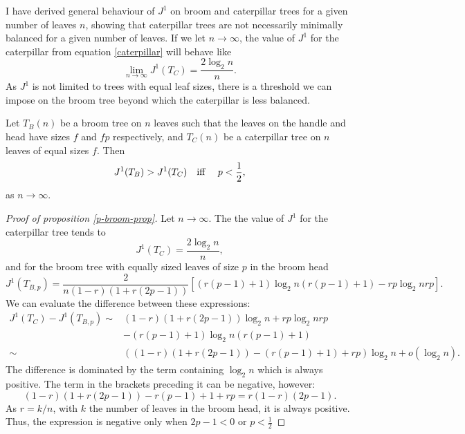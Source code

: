 I have derived general behaviour of $J^1$ on broom and caterpillar trees for a
given number of leaves $n$, showing that caterpillar trees are not necessarily
minimally balanced for a given number of leaves. If we let $n\to\infty$, the
value of $J^1$ for the caterpillar from equation \eqref{caterpillar} will
behave like
\begin{equation}
    \lim_{n\to\infty} J^1(T_C) = \frac{2\log_2n}{n}. \label{caterpillarlim}
\end{equation}
As $J^1$ is not limited to trees with equal leaf sizes, there is a threshold we
can impose on the broom tree beyond which the caterpillar is less balanced.

\begin{proposition}\label{p-broom-prop}
    Let $T_B(n)$ be a broom tree on $n$ leaves such that the leaves on the
    handle and head have sizes $f$ and $fp$ respectively, and $T_C(n)$ be a
    caterpillar tree on $n$ leaves of equal sizes $f$. Then
    \begin{equation}\label{p-broom-cond}
        J^1(T_B) > J^1(T_C) \text{\quad iff \quad} p<\frac{1}{2},
    \end{equation}
    as $n\to\infty$.
\end{proposition}
\begin{proof}[Proof of proposition \ref{p-broom-prop}]
    Let $n\to\infty$. The the value of $J^1$ for the caterpillar tree tends to
    \begin{equation*}
        J^1(T_C) = \frac{2\log_2n}{n},
    \end{equation*}
    and for the broom tree with equally sized leaves of size $p$ in the broom head
    \begin{equation*}
        J^1(T_{B,p}) = \frac{2}{n(1-r)(1+r(2p-1))}\left[ (r(p-1)+1)\log_2
        n(r(p-1)+1) - rp\log_2 nrp \right].
    \end{equation*}
    We can evaluate the difference between these expressions:
    \begin{align*}
        J^1(T_C) - J^1(T_{B,p})  \sim &  (1-r)(1+r(2p-1))\log_2n+rp\log_2nrp \\
        & - (r(p-1)+1)\log_2n(r(p-1)+1) \\
        \sim & ((1-r)(1+r(2p-1))-(r(p-1)+1)+rp)\log_2n + o(\log_2n).
    \end{align*}
    The difference is dominated by the term containing $\log_2n$ which is always
    positive. The term in the brackets preceding it can be negative, however:
    \begin{equation*}
        (1-r)(1+r(2p-1)) - r(p-1) + 1 + rp = r(1-r)(2p-1).
    \end{equation*}
    As $r = k/n$, with $k$ the number of leaves in the broom head, it is always
    positive. Thus, the expression is negative only when $2p-1<0$ or $p<\frac{1}{2}$
\end{proof}

